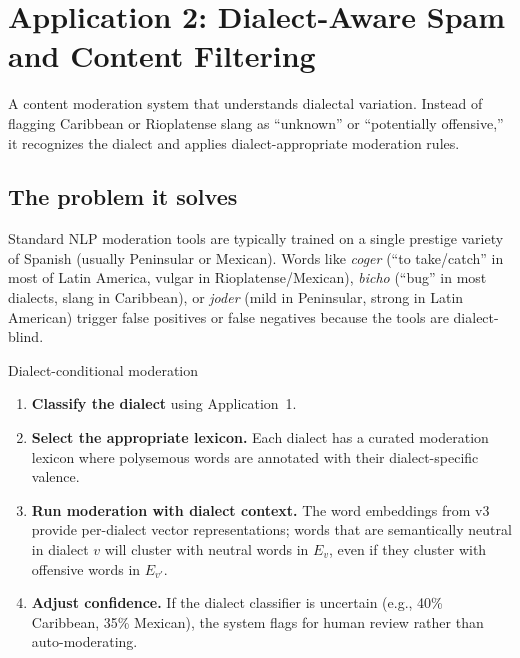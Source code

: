 \documentclass[11pt,a4paper]{article}
\begin{document}
\section{Application 2: Dialect-Aware Spam and Content Filtering}
\label{sec:app-filter}

\begin{appbox}
A content moderation system that understands dialectal variation.
Instead of flagging Caribbean or Rioplatense slang as ``unknown'' or
``potentially offensive,'' it recognizes the dialect and applies
dialect-appropriate moderation rules.
\end{appbox}

\subsection{The problem it solves}

Standard NLP moderation tools are typically trained on a single
prestige variety of Spanish (usually Peninsular or Mexican). Words
like \emph{coger} (``to take/catch'' in most of Latin America,
vulgar in Rioplatense/Mexican), \emph{bicho} (``bug'' in most
dialects, slang in Caribbean), or \emph{joder} (mild in Peninsular,
strong in Latin American) trigger false positives or false negatives
because the tools are dialect-blind.

\begin{howbox}{Dialect-conditional moderation}
\begin{enumerate}[nosep]
  \item \textbf{Classify the dialect} using Application~1.
  \item \textbf{Select the appropriate lexicon.} Each dialect has a
    curated moderation lexicon where polysemous words are annotated
    with their dialect-specific valence.
  \item \textbf{Run moderation with dialect context.} The word
    embeddings from v3 provide per-dialect vector representations;
    words that are semantically neutral in dialect $v$ will cluster
    with neutral words in $E_v$, even if they cluster with offensive
    words in $E_{v'}$.
  \item \textbf{Adjust confidence.} If the dialect classifier is
    uncertain (e.g., 40\% Caribbean, 35\% Mexican), the system
    flags for human review rather than auto-moderating.
\end{enumerate}
\end{howbox}
\end{document}
